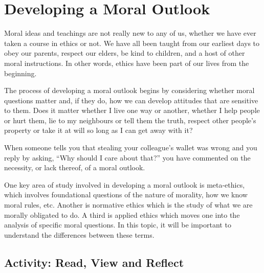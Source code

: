 \documentclass[
]{book}
\begin{document}
\hypertarget{developing-a-moral-outlook}{%
\section{Developing a Moral Outlook}\label{developing-a-moral-outlook}}

Moral ideas and teachings are not really new to any of us, whether we have ever taken a course in ethics or not. We have all been taught from our earliest days to obey our parents, respect our elders, be kind to children, and a host of other moral instructions. In other words, ethics have been part of our lives from the beginning.

The process of developing a moral outlook begins by considering whether moral questions matter and, if they do, how we can develop attitudes that are sensitive to them. Does it matter whether I live one way or another, whether I help people or hurt them, lie to my neighbours or tell them the truth, respect other people's property or take it at will so long as I can get away with it?

When someone tells you that stealing your colleague's wallet was wrong and you reply by asking, ``Why should I care about that?'' you have commented on the necessity, or lack thereof, of a moral outlook.

One key area of study involved in developing a moral outlook is meta-ethics, which involves foundational questions of the nature of morality, how we know moral rules, etc. Another is normative ethics which is the study of what we are morally obligated to do. A third is applied ethics which moves one into the analysis of specific moral questions. In this topic, it will be important to understand the differences between these terms.

\hypertarget{activity-read-view-and-reflect}{%
\subsection*{Activity: Read, View and Reflect}\label{activity-read-view-and-reflect}}
\end{document}

